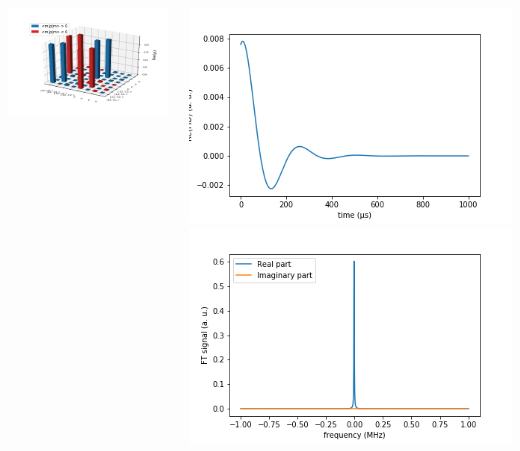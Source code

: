 \documentclass[10pt]{beamer}
\begin{document}
\begin{frame}
\begin{columns}[T]
\begin{column}{.5\textwidth}
\begin{column}{.5\textwidth}
\end{column}
\begin{column}{.5\textwidth}
\includegraphics[width=1.3\textwidth]{./test/11uncorrelated_mixed_no_interactions/EvolvedRealPartDensityMatrix.png}
\end{column}
\end{column}
\begin{column}{.5\textwidth}
\includegraphics[width=\textwidth]{./test/11uncorrelated_mixed_no_interactions/FIDSignal.png}
\includegraphics[width=\textwidth]{./test/11uncorrelated_mixed_no_interactions/FTSignal.png}
\end{column}
\end{columns}
\end{frame}
\end{document}
